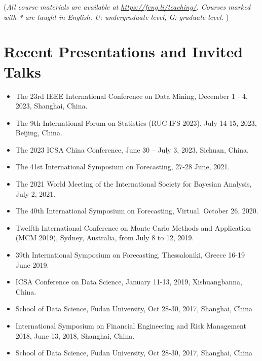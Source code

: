 \documentclass[twoside,a4paper]{article}
\begin{document}
{\footnotesize (\emph{All course materials are available at
    \emph{\url{https://feng.li/teaching/}}. Courses marked with * are taught in English. U: undergraduate level, G: graduate level. })}


\section{Recent Presentations and Invited Talks}
\begin{itemize}

\item The 23rd IEEE International Conference on Data Mining, December 1 - 4, 2023, Shanghai, China.

\item The 9th International Forum on Statistics (RUC IFS 2023), July 14-15, 2023, Beijing, China.

\item The 2023 ICSA China Conference, June 30 – July 3, 2023, Sichuan, China.

\item The 41st International Symposium on Forecasting, 27-28 June, 2021.

\item The 2021 World Meeting of the International Society for Bayesian Analysis, July 2, 2021.

\item The 40th International Symposium on Forecasting, Virtual. October 26, 2020.

\item Twelfth International Conference on Monte Carlo Methods and Application (MCM 2019), Sydney, Australia, from July 8 to 12, 2019.

\item 39th International Symposium on Forecasting, Thessaloniki, Greece 16-19 June 2019.

\item ICSA Conference on Data Science, January 11-13, 2019, Xishuangbanna, China.

\item School of Data Science, Fudan University, Oct 28-30, 2017, Shanghai, China

\item International Symposium on Financial Engineering and Risk Management 2018, June 13, 2018, Shanghai, China.

\item School of Data Science, Fudan University, Oct 28-30, 2017, Shanghai, China


\end{itemize}
\end{document}
